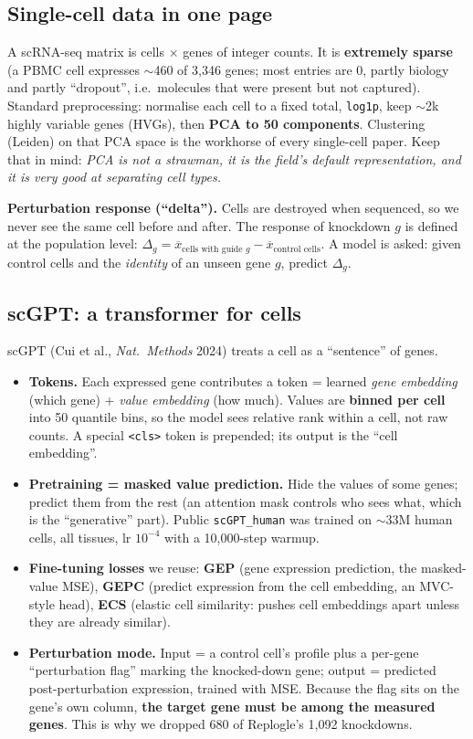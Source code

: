 \documentclass[11pt]{article}
\newcommand{\code}[1]{\texttt{\small #1}}
\begin{document}
\subsection{Single-cell data in one page}
A scRNA-seq matrix is cells $\times$ genes of integer counts. It is \textbf{extremely sparse} (a PBMC cell expresses $\sim$460 of 3,346 genes; most entries are 0, partly biology and partly ``dropout'', i.e.\ molecules that were present but not captured). Standard preprocessing: normalise each cell to a fixed total, \code{log1p}, keep $\sim$2k highly variable genes (HVGs), then \textbf{PCA to 50 components}. Clustering (Leiden) on that PCA space is the workhorse of every single-cell paper. Keep that in mind: \emph{PCA is not a strawman, it is the field's default representation, and it is very good at separating cell types.}

\textbf{Perturbation response (``delta'').} Cells are destroyed when sequenced, so we never see the same cell before and after. The response of knockdown $g$ is defined at the population level:
$\Delta_g = \overline{x}_{\text{cells with guide } g} - \overline{x}_{\text{control cells}}$.
A model is asked: given control cells and the \emph{identity} of an unseen gene $g$, predict $\Delta_g$.

\subsection{scGPT: a transformer for cells}
scGPT (Cui et al., \emph{Nat.\ Methods} 2024) treats a cell as a ``sentence'' of genes.
\begin{itemize}
\item \textbf{Tokens.} Each expressed gene contributes a token = learned \emph{gene embedding} (which gene) + \emph{value embedding} (how much). Values are \textbf{binned per cell} into 50 quantile bins, so the model sees relative rank within a cell, not raw counts. A special \code{<cls>} token is prepended; its output is the ``cell embedding''.
\item \textbf{Pretraining = masked value prediction.} Hide the values of some genes; predict them from the rest (an attention mask controls who sees what, which is the ``generative'' part). Public \code{scGPT\_human} was trained on $\sim$33M human cells, all tissues, lr $10^{-4}$ with a 10,000-step warmup.
\item \textbf{Fine-tuning losses} we reuse: \textbf{GEP} (gene expression prediction, the masked-value MSE), \textbf{GEPC} (predict expression from the cell embedding, an MVC-style head), \textbf{ECS} (elastic cell similarity: pushes cell embeddings apart unless they are already similar).
\item \textbf{Perturbation mode.} Input = a control cell's profile plus a per-gene ``perturbation flag'' marking the knocked-down gene; output = predicted post-perturbation expression, trained with MSE. Because the flag sits on the gene's own column, \textbf{the target gene must be among the measured genes}. This is why we dropped 680 of Replogle's 1,092 knockdowns.
\end{itemize}
\end{document}
